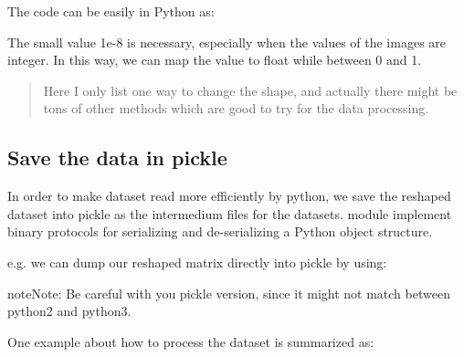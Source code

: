 \documentclass[letterpaper,10pt,english]{sphinxmanual}
\begin{document}
The code can be easily in Python as:

%
\begin{sphinxVerbatim}[commandchars=\\\{\}]
      
\end{sphinxVerbatim}

The small value 1e-8 is necessary, especially when the values of the images are integer. In this way, we can map the value to float while between 0 and 1.
\begin{quote}

Here I only list one way to change the shape, and actually there might be tons of other methods which are good to try for the data processing.
\end{quote}


\subsection{Save the data in pickle}
\label{\detokenize{usage/data:save-the-data-in-pickle}}
In order to make dataset read more efficiently by python, we save the reshaped dataset into pickle as the intermedium files for the datasets.  module implement binary protocols for serializing and de-serializing a Python object structure.

e.g. we can dump our reshaped matrix directly into pickle by using:

%
\begin{sphinxVerbatim}[commandchars=\\\{\}]
  
\end{sphinxVerbatim}

\begin{sphinxadmonition}{note}{Note:}
Be careful with you pickle version, since it might not match between python2 and python3.
\end{sphinxadmonition}

One example about how to process the dataset is summarized as:
\end{document}
